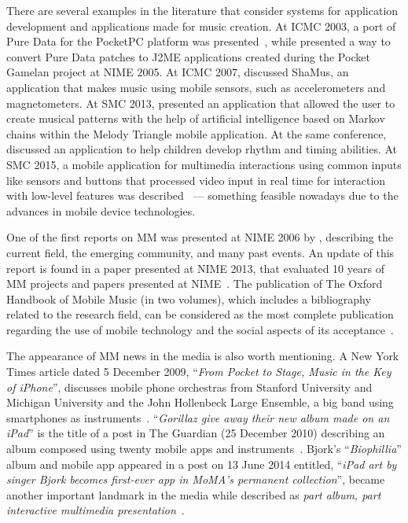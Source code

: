 There are several examples in the literature that consider systems for application development and applications made for music creation.
At ICMC 2003, a port of Pure Data for the PocketPC platform was presented~\citep{Geiger2003pda}, while
\cite{Schiemer2005pocketgamelan} presented a way to convert Pure Data patches to J2ME applications created during the Pocket Gamelan project at NIME 2005.
At ICMC 2007, \cite{Essl2007shamus} discussed ShaMus, an application that makes music using mobile sensors, such as accelerometers and magnetometers.
At SMC 2013, \cite{Ekeus2013predictable} presented an application that allowed the user to create musical patterns with the help of artificial intelligence based on Markov chains within the Melody Triangle mobile application.
At the same conference, \cite{Baldan2013melody} discussed an application to help children develop rhythm and timing abilities.
At SMC 2015, a mobile application for multimedia interactions using common inputs like sensors and buttons that processed video input in real time for interaction with low-level features was described~\citep{Krekovic2015sound} --- something feasible nowadays due to the advances in mobile device technologies.

One of the first reports on MM was presented at NIME 2006 by \cite{Gaye2006report}, describing the current field, the emerging community, and many past events.
An update of this report is found in a paper presented at NIME 2013, that evaluated 10 years of MM projects and papers presented at NIME~\citep{John2013updating}.
The publication of The Oxford Handbook of Mobile Music (in two volumes), which includes a bibliography related to the research field, can be considered as the most complete publication regarding the use of mobile technology and the social aspects of its acceptance~\citep{Gopinath2014handbookmobilemusicstudies1,Gopinath2014handbookmobilemusicstudies2}.

The appearance of MM news in the media is also worth mentioning.
A New York Times article dated 5 December 2009, ``\textit{From Pocket to Stage, Music in the Key of iPhone}'', discusses mobile phone orchestras from Stanford University and Michigan University and the John Hollenbeck Large Ensemble, a big band using smartphones as instruments~\citep{Miller2009nytimes}.
``\textit{Gorillaz give away their new album made on an iPad}'' is the title of a post in The Guardian (25 December 2010) describing an album composed using twenty mobile apps and instruments~\citep{Smith2010gorillaz}.
Bjork's ``\textit{Biophillia}'' album and mobile app appeared in a post on 13 June 2014 entitled, ``\textit{iPad art by singer Bjork becomes first-ever app in MoMA's permanent collection}'', became another important landmark in the media while described as \textit{part album, part interactive multimedia presentation}~\citep{Hughes2014bjork}.

